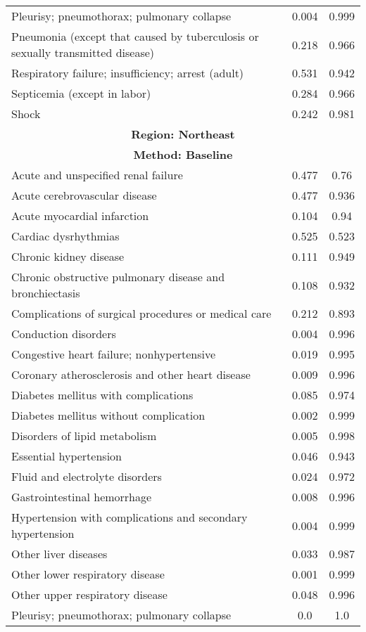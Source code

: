 \documentclass{article}
\begin{document}
\begin{longtable}{lcc}
Pleurisy; pneumothorax; pulmonary collapse & 0.004 & 0.999 \\
Pneumonia (except that caused by tuberculosis or sexually transmitted disease) & 0.218 & 0.966 \\
Respiratory failure; insufficiency; arrest (adult) & 0.531 & 0.942 \\
Septicemia (except in labor) & 0.284 & 0.966 \\
Shock & 0.242 & 0.981 \\
\midrule
\midrule
\multicolumn{3}{c}{\textbf{Region: Northeast}} \\
\multicolumn{3}{c}{\textbf{Method: Baseline}} \\
\midrule
Acute and unspecified renal failure & 0.477 & 0.76 \\
Acute cerebrovascular disease & 0.477 & 0.936 \\
Acute myocardial infarction & 0.104 & 0.94 \\
Cardiac dysrhythmias & 0.525 & 0.523 \\
Chronic kidney disease & 0.111 & 0.949 \\
Chronic obstructive pulmonary disease and bronchiectasis & 0.108 & 0.932 \\
Complications of surgical procedures or medical care & 0.212 & 0.893 \\
Conduction disorders & 0.004 & 0.996 \\
Congestive heart failure; nonhypertensive & 0.019 & 0.995 \\
Coronary atherosclerosis and other heart disease & 0.009 & 0.996 \\
Diabetes mellitus with complications & 0.085 & 0.974 \\
Diabetes mellitus without complication & 0.002 & 0.999 \\
Disorders of lipid metabolism & 0.005 & 0.998 \\
Essential hypertension & 0.046 & 0.943 \\
Fluid and electrolyte disorders & 0.024 & 0.972 \\
Gastrointestinal hemorrhage & 0.008 & 0.996 \\
Hypertension with complications and secondary hypertension & 0.004 & 0.999 \\
Other liver diseases & 0.033 & 0.987 \\
Other lower respiratory disease & 0.001 & 0.999 \\
Other upper respiratory disease & 0.048 & 0.996 \\
Pleurisy; pneumothorax; pulmonary collapse & 0.0 & 1.0 \\

\end{longtable}
\end{document}
